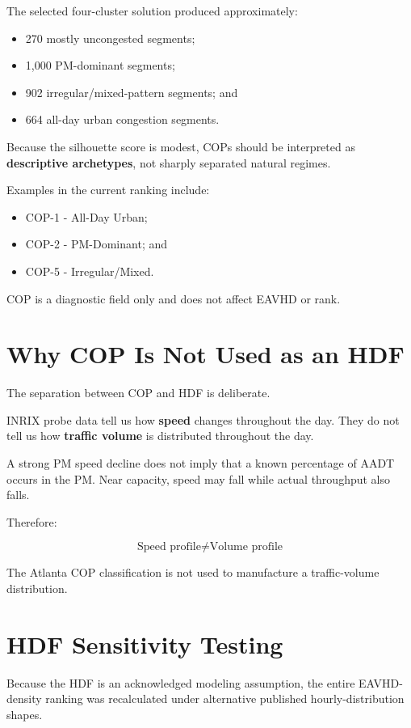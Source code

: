 \documentclass[11pt]{article}
\begin{document}
The selected four-cluster solution produced approximately:

\begin{itemize}
    \item 270 mostly uncongested segments;
    \item 1,000 PM-dominant segments;
    \item 902 irregular/mixed-pattern segments; and
    \item 664 all-day urban congestion segments.
\end{itemize}

Because the silhouette score is modest, COPs should be interpreted as \textbf{descriptive archetypes}, not sharply separated natural regimes.

Examples in the current ranking include:

\begin{itemize}
    \item COP-1 - All-Day Urban;
    \item COP-2 - PM-Dominant; and
    \item COP-5 - Irregular/Mixed.
\end{itemize}

COP is a diagnostic field only and does not affect EAVHD or rank.

\section{Why COP Is Not Used as an HDF}

The separation between COP and HDF is deliberate.

INRIX probe data tell us how \textbf{speed} changes throughout the day. They do not tell us how \textbf{traffic volume} is distributed throughout the day.

A strong PM speed decline does not imply that a known percentage of AADT occurs in the PM. Near capacity, speed may fall while actual throughput also falls.

Therefore:

\[
\boxed{\text{Speed profile} \neq \text{Volume profile}}
\]

The Atlanta COP classification is not used to manufacture a traffic-volume distribution.

\section{HDF Sensitivity Testing}

Because the HDF is an acknowledged modeling assumption, the entire EAVHD-density ranking was recalculated under alternative published hourly-distribution shapes.
\end{document}
